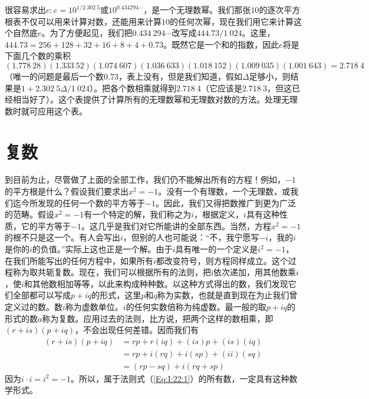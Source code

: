 很容易求出$e:e=10^{1/2.302~5}$或$10^{0.434 294\cdots}$，是一个无理数幂。我们那张$10$的逐次平方根表不仅可以用来计算对数，还能用来计算$10$的任何次幂，现在我们用它来计算这个自然底$e$。为了方便起见，我们把$0.434~294\cdots$改写成$444.73/1~024$。这里，$444.73=256+128+32+16+8+4+0.73$。既然它是一个和的指数，因此$e$将是下面几个数的乘积
\begin{equation*}
    (1.778~28)(1.333~52)(1.074~607)(1.036~633)(1.018~152)(1.009~035)(1.001~643)=2.718~4
\end{equation*}
（唯一的问题是最后一个数$0.73$，表上没有，但是我们知道，假如$\Delta$足够小，则结果是$1+2.302~5\Delta/1~024$）。把各个数相乘就得到$2.718~4$（它应该是$2.718~3$，但这已经相当好了）。这个表提供了计算所有的无理数幂和无理数对数的方法。处理无理数时就可应用这个表。

\section{复数}

到目前为止，尽管做了上面的全部工作，我们仍不能解出所有的方程！例如，$-1$的平方根是什么？假设我们要求出$x^2=-1$。没有一个有理数，一个无理数，或我们迄今所发现的任何一个数的平方等于$-1$。因此，我们又得把数推广到更为广泛的范畴。假设$x^2=-1$有一个特定的解，我们称之为$i$，根据定义，$i$具有这种性质，它的平方等于$-1$。这几乎是我们对它所能讲的全部东西。当然，方程$x^2=-1$的根不只是这一个。有人会写出$i$，但别的人也可能说：“不，我宁愿写$-i$，我的$i$是你的$i$的负值。”实际上这也正是一个解。由于$i$具有唯一的一个定义是$i^2=-1$，在我们所能写出的任何方程中，如果所有$i$都改变符号，则方程同样成立。这个过程称为取共轭复数。现在，我们可以根据所有的法则，把i依次递加，用其他数乘$i$，使$i$和其他数相加等等，以此来构成种种数。以这种方式得出的数，我们发现它们全部都可以写成$p+iq$的形式，这里$p$和$q$称为实数，也就是直到现在为止我们曾定义过的数。数$i$称为虚数单位。$i$的任何实数倍称为纯虚数。最一般的取$p+iq$的形式的数$a$称为复数。应用过去的法则，比方说，把两个这样的数相乘，即$(r+is)(p+iq)$，不会出现任何差错。因而我们有
\begin{equation}
    \label{Eq:I:22:4}
    \begin{aligned}
        (r+is)(p+iq)&=rp+r(iq)+(is)p+(is)(iq) \\
        &=rp+i(rq)+i(sp)+(ii)(sq) \\
        &=(rp-sq)+i(rq+sp)
    \end{aligned}
\end{equation}
因为$i\cdot i=i^2=-1$。所以，属于法则式（\ref{Eq:I:22:1}）的所有数，一定具有这种数学形式。

